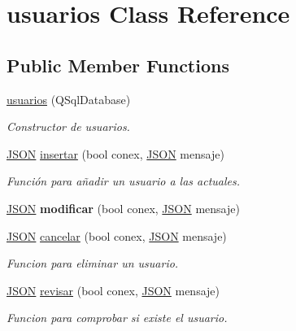 \hypertarget{classusuarios}{}\section{usuarios Class Reference}
\label{classusuarios}
\subsection*{Public Member Functions}
\begin{DoxyCompactItemize}
\item 
\mbox{\hyperlink{classusuarios_adaf928e8a210acac0e9792e0cd4e667f}{usuarios}} (Q\+Sql\+Database)
\begin{DoxyCompactList}\small\item\em Constructor de usuarios. \end{DoxyCompactList}\item 
\mbox{\hyperlink{classnlohmann_1_1basic__json}{J\+S\+ON}} \mbox{\hyperlink{classusuarios_a6939c773dde8627785009eacd28dd9a8}{insertar}} (bool conex, \mbox{\hyperlink{classnlohmann_1_1basic__json}{J\+S\+ON}} mensaje)
\begin{DoxyCompactList}\small\item\em Función para añadir un usuario a las actuales. \end{DoxyCompactList}\item 
\mbox{\label{classusuarios_a2ab004f03d21059be4321506ad89dc8f}} 
\mbox{\hyperlink{classnlohmann_1_1basic__json}{J\+S\+ON}} {\bfseries modificar} (bool conex, \mbox{\hyperlink{classnlohmann_1_1basic__json}{J\+S\+ON}} mensaje)
\item 
\mbox{\hyperlink{classnlohmann_1_1basic__json}{J\+S\+ON}} \mbox{\hyperlink{classusuarios_a3a93fae14bb3554e1b9d4742dd9e6a97}{cancelar}} (bool conex, \mbox{\hyperlink{classnlohmann_1_1basic__json}{J\+S\+ON}} mensaje)
\begin{DoxyCompactList}\small\item\em Funcion para eliminar un usuario. \end{DoxyCompactList}\item 
\mbox{\hyperlink{classnlohmann_1_1basic__json}{J\+S\+ON}} \mbox{\hyperlink{classusuarios_ad875eae5fff50925fa35dfa80728a87e}{revisar}} (bool conex, \mbox{\hyperlink{classnlohmann_1_1basic__json}{J\+S\+ON}} mensaje)
\begin{DoxyCompactList}\small\item\em Funcion para comprobar si existe el usuario. \end{DoxyCompactList}\end{DoxyCompactItemize}
